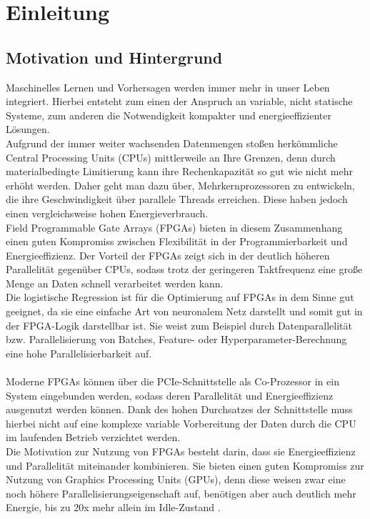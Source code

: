 \chapter{Einleitung}
\section{Motivation und Hintergrund}
Maschinelles Lernen und Vorhersagen werden immer mehr in unser Leben integriert. Hierbei entsteht zum einen der Anspruch an variable, nicht statische Systeme, zum anderen die Notwendigkeit kompakter und energieeffizienter Lösungen.\\
Aufgrund der immer weiter wachsenden Datenmengen stoßen herkömmliche Central Processing Units (CPUs) mittlerweile an Ihre Grenzen, denn durch materialbedingte Limitierung kann ihre Rechenkapazität so gut wie nicht mehr erhöht werden. Daher geht man dazu über, Mehrkernprozessoren zu entwickeln, die ihre Geschwindigkeit über parallele Threads erreichen. Diese haben jedoch einen vergleichsweise hohen Energieverbrauch.\\
Field Programmable Gate Arrays (FPGAs) bieten in diesem Zusammenhang einen guten Kompromiss zwischen Flexibilität in der Programmierbarkeit und Energieeffizienz. Der Vorteil der FPGAs zeigt sich in der deutlich höheren Parallelität gegenüber CPUs, sodass trotz der geringeren Taktfrequenz eine große Menge an Daten schnell verarbeitet werden kann.\\
Die logistische Regression ist für die Optimierung auf FPGAs in dem Sinne gut geeignet, da sie eine einfache Art von neuronalem Netz darstellt und somit gut in der FPGA-Logik darstellbar ist. Sie weist zum Beispiel durch Datenparallelität bzw. Parallelisierung von Batches, Feature- oder Hyperparameter-Berechnung eine hohe Parallelisierbarkeit auf.\\\\
Moderne FPGAs können über die PCIe-Schnittstelle als Co-Prozessor in ein System eingebunden werden, sodass deren Parallelität und Energieeffizienz ausgenutzt werden können. Dank des hohen Durchsatzes der Schnittstelle muss hierbei nicht auf eine komplexe variable Vorbereitung der Daten durch die CPU im laufenden Betrieb verzichtet werden.\\
Die Motivation zur Nutzung von FPGAs besteht darin, dass sie Energieeffizienz und Parallelität miteinander kombinieren. Sie bieten einen guten Kompromiss zur Nutzung von Graphics Processing Units (GPUs), denn diese weisen zwar eine noch höhere Parallelisierungseigenschaft auf, benötigen aber auch deutlich mehr Energie, bis zu 20x mehr allein im Idle-Zustand \cite{GPU}.

